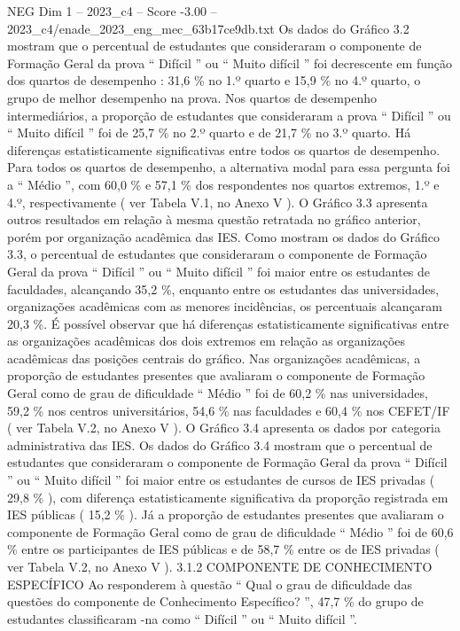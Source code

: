 \begin{textsample}{NEG Dim 1 – 2023\_c4 – Score -3.00 – 2023\_c4/enade\_2023\_eng\_mec\_63b17ce9db.txt}
Os dados do Gráfico 3.2 mostram que o percentual de estudantes que consideraram o componente de Formação Geral da prova “ Difícil ” ou “ Muito difícil ” foi decrescente em função dos quartos de desempenho : 31,6 \% no 1.º quarto e 15,9 \% no 4.º quarto, o grupo de melhor desempenho na prova.
Nos quartos de desempenho intermediários, a proporção de estudantes que consideraram a prova “ Difícil ” ou “ Muito difícil ” foi de 25,7 \% no 2.º quarto e de 21,7 \% no 3.º quarto.
Há diferenças estatisticamente significativas entre todos os quartos de desempenho.
Para todos os quartos de desempenho, a alternativa modal para essa pergunta foi a “ Médio ”, com 60,0 \% e 57,1 \% dos respondentes nos quartos extremos, 1.º e 4.º, respectivamente ( ver Tabela V.1, no Anexo V ).
O Gráfico 3.3 apresenta outros resultados em relação à mesma questão retratada no gráfico anterior, porém por organização acadêmica das IES.
Como mostram os dados do Gráfico 3.3, o percentual de estudantes que consideraram o componente de Formação Geral da prova “ Difícil ” ou “ Muito difícil ” foi maior entre os estudantes de faculdades, alcançando 35,2 \%, enquanto entre os estudantes das universidades, organizações acadêmicas com as menores incidências, os percentuais alcançaram 20,3 \%.
É possível observar que há diferenças estatisticamente significativas entre as organizações acadêmicas dos dois extremos em relação as organizações acadêmicas das posições centrais do gráfico.
Nas organizações acadêmicas, a proporção de estudantes presentes que avaliaram o componente de Formação Geral como de grau de dificuldade “ Médio ” foi de 60,2 \% nas universidades, 59,2 \% nos centros universitários, 54,6 \% nas faculdades e 60,4 \% nos CEFET/IF ( ver Tabela V.2, no Anexo V ).
O Gráfico 3.4 apresenta os dados por categoria administrativa das IES.
Os dados do Gráfico 3.4 mostram que o percentual de estudantes que consideraram o componente de Formação Geral da prova “ Difícil ” ou “ Muito difícil ” foi maior entre os estudantes de cursos de IES privadas ( 29,8 \% ), com diferença estatisticamente significativa da proporção registrada em IES públicas ( 15,2 \% ).
Já a proporção de estudantes presentes que avaliaram o componente de Formação Geral como de grau de dificuldade “ Médio ” foi de 60,6 \% entre os participantes de IES públicas e de 58,7 \% entre os de IES privadas ( ver Tabela V.2, no Anexo V ). 3.1.2 COMPONENTE DE CONHECIMENTO ESPECÍFICO Ao responderem à questão “ Qual o grau de dificuldade das questões do componente de Conhecimento Específico? ”, 47,7 \% do grupo de estudantes classificaram -na como “ Difícil ” ou “ Muito difícil ”.

\end{textsample}
